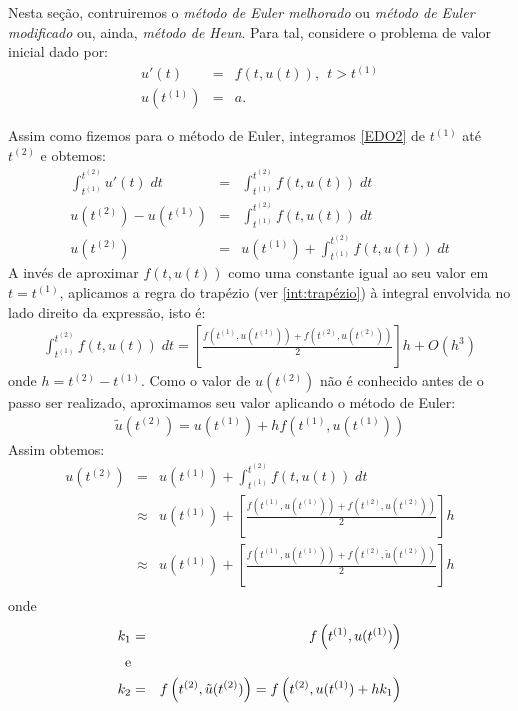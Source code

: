 Nesta seção, contruiremos o \emph{método de Euler melhorado} ou \emph{método de Euler modificado} ou, ainda, \emph{método de Heun}. Para tal, considere o problema de valor inicial dado por:
\begin{eqnarray}\label{EDO2}
  u'(t)  &=& f(t,u(t)),~~t>t^{(1)} \\
  u(t^{(1)}) &=& a.
\end{eqnarray}

Assim como fizemos para o método de Euler, integramos \eqref{EDO2} de $t^{(1)}$ até $t^{(2)}$ e obtemos:
\begin{eqnarray}
  \int_{t^{(1)}}^{t^{(2)}} u'(t) \;dt &=& \int_{t^{(1)}}^{t^{(2)}} f(t,u(t)) \; dt\\
  u(t^{(2)})-u(t^{(1)})               &=& \int_{t^{(1)}}^{t^{(2)}} f(t,u(t)) \; dt\\
  u(t^{(2)})                      &=& u(t^{(1)}) +  \int _{t^{(1)}}^{t^{(2)}} f(t,u(t)) \; dt
\end{eqnarray}
A invés de aproximar $f(t,u(t))$ como uma constante igual ao seu valor em $t=t^{(1)}$, aplicamos a regra do trapézio (ver \ref{int:trapézio}) à integral envolvida no lado direito da expressão, isto é:
\begin{eqnarray}\label{pvi:euler_mel_eq}
\int _{t^{(1)}}^{t^{(2)}} f(t,u(t)) \; dt = \left[\frac{f\left(t^{(1)},u(t^{(1)})\right)+f\left(t^{(2)},u(t^{(2)})\right)}{2}\right]h + O(h^3)
\end{eqnarray}
onde $h=t^{(2)}-t^{(1)}$.
Como o valor de $u(t^{(2)})$ não é conhecido antes de o passo ser realizado, aproximamos seu valor aplicando o método de Euler:
\begin{eqnarray*}
\tilde{u}(t^{(2)})= u(t^{(1)})+h f\left(t^{(1)},u(t^{(1)})\right)
\end{eqnarray*}
Assim obtemos:
\begin{eqnarray*}
  u(t^{(2)})&=& u(t^{(1)}) +  \int _{t^{(1)}}^{t^{(2)}} f(t,u(t)) \; dt\\
  &\approx& u(t^{(1)}) +\left[\frac{f\left(t^{(1)},u(t^{(1)})\right)+f\left(t^{(2)},u(t^{(2)})\right)}{2}\right]h\\
  &\approx& u(t^{(1)}) +\left[\frac{f\left(t^{(1)},u(t^{(1)})\right)+f\left(t^{(2)},\tilde{u}(t^{(2)})\right)}{2}\right]h\\
\end{eqnarray*}
onde 
\begin{eqnarray*}
k_1&=&f\left(t^{(1)},u(t^{(1)})\right)\\
\hbox{e}\\
k_2&=&f\left(t^{(2)},\tilde{u}(t^{(2)})\right)=f\left(t^{(2)}, u(t^{(1)})+hk_1 \right )
\end{eqnarray*}

